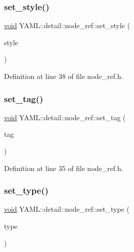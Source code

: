 \subsubsection{\texorpdfstring{set\_style()}{set\_style()}}
{\footnotesize\ttfamily \mbox{\hyperlink{glad_8h_a950fc91edb4504f62f1c577bf4727c29}{void}} Y\+A\+M\+L\+::detail\+::node\+\_\+ref\+::set\+\_\+style (\begin{DoxyParamCaption}\item[{\mbox{\hyperlink{struct_y_a_m_l_1_1_emitter_style_ae86640662c85ce6062a37f9636b6959f}{Emitter\+Style\+::value}}}]{style }\end{DoxyParamCaption})\hspace{0.3cm}{\ttfamily [inline]}}



Definition at line 38 of file node\+\_\+ref.\+h.

\mbox{\label{class_y_a_m_l_1_1detail_1_1node__ref_a55d8684b43471c4af39ae94ffbd07fb3}} 
\subsubsection{\texorpdfstring{set\_tag()}{set\_tag()}}
{\footnotesize\ttfamily \mbox{\hyperlink{glad_8h_a950fc91edb4504f62f1c577bf4727c29}{void}} Y\+A\+M\+L\+::detail\+::node\+\_\+ref\+::set\+\_\+tag (\begin{DoxyParamCaption}\item[{const \mbox{\hyperlink{glad_8h_ac83513893df92266f79a515488701770}{std\+::string}} \&}]{tag }\end{DoxyParamCaption})\hspace{0.3cm}{\ttfamily [inline]}}



Definition at line 35 of file node\+\_\+ref.\+h.

\mbox{\label{class_y_a_m_l_1_1detail_1_1node__ref_ab470ee21f3acd32e317a375528802a15}} 
\subsubsection{\texorpdfstring{set\_type()}{set\_type()}}
{\footnotesize\ttfamily \mbox{\hyperlink{glad_8h_a950fc91edb4504f62f1c577bf4727c29}{void}} Y\+A\+M\+L\+::detail\+::node\+\_\+ref\+::set\+\_\+type (\begin{DoxyParamCaption}\item[{\mbox{\hyperlink{struct_y_a_m_l_1_1_node_type_af83cf3f3c2eca0bf0eae1bbf981e86c4}{Node\+Type\+::value}}}]{type }\end{DoxyParamCaption})\hspace{0.3cm}{\ttfamily [inline]}}



